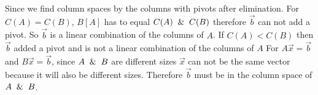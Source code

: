 Since we find column spaces by the columns with pivots after elimination.
		For
		\newline
		$C(A)=C(B)$, $B[A]$ has to equal $C(A) \And C(B)$ therefore $\vec{b}$ can not add a pivot. So $\vec{b}$ is a linear combination of the columns of $A$.
		\newline
		\newline
		If $C(A) < C(B)$ then $\vec{b}$ added a pivot and is not a linear combination of the columns of $A$
		\newline
		\newline
		For $A\vec{x}=\vec{b}$ and $B\vec{x}=\vec{b}$, since $A \And B$ are different sizes $\vec{x}$ can not be the same vector because it will also be different sizes.  Therefore $\vec{b}$ must be in the column space of $A \And B$.